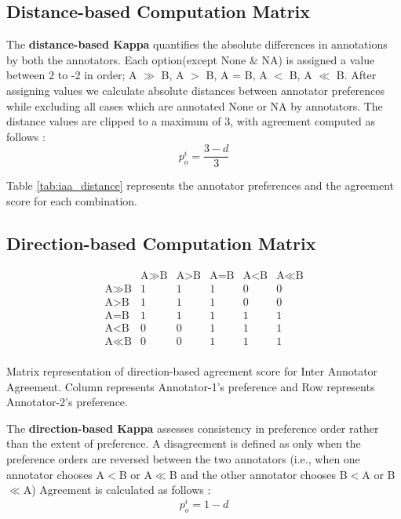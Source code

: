 \subsection{Distance-based Computation Matrix}
The \textbf{distance-based Kappa} quantifies the absolute differences in annotations by both the annotators. Each option(except None \& NA) is assigned a value between 2 to -2 in order; A $\gg$ B, A $>$ B, A = B, A $<$ B, A $\ll$ B. After assigning values we calculate absolute distances between annotator preferences while excluding all cases which are annotated None or NA by annotators. The distance values are clipped to a maximum of 3, with agreement computed as follows : 
\begin{equation*}
    p_o^{i} = \frac{3 - d}{3}
\end{equation*}

Table \ref{tab:iaa_distance} represents the annotator preferences and the agreement score for each combination.

\subsection{Direction-based Computation Matrix}

\begin{table}[h!]
    \centering
    \[
    \begin{array}{c|ccccc}
        & \text{A$\gg$B} & \text{A$>$B} & \text{A$=$B} & \text{A$<$B} & \text{A$\ll$B} \\ \hline
    \text{A$\gg$B} & 1 & 1 & 1 & 0 & 0 \\
    \text{A$>$B} & 1 & 1 & 1 & 0 & 0 \\
    \text{A$=$B} & 1 & 1 & 1 & 1 & 1 \\
    \text{A$<$B} & 0 & 0 & 1 & 1 & 1 \\
    \text{A$\ll$B} & 0 & 0 & 1 & 1 & 1 \\
    \end{array}
    \]
    \caption{Matrix representation of direction-based agreement score for Inter Annotator Agreement. Column represents Annotator-1's preference and Row represents Annotator-2's preference.}
    \label{tab:iaa_direction}
\end{table}


The \textbf{direction-based Kappa} assesses consistency in preference order rather than the extent of preference. A disagreement is defined as only when the preference orders are reversed between the two annotators (i.e., when one annotator chooses A$<$B or A$\ll$B and the other annotator chooses B$<$A or B$\ll$A) Agreement is calculated as follows : 
\begin{equation*}
    p_o^{i} = 1 - d
\end{equation*}

